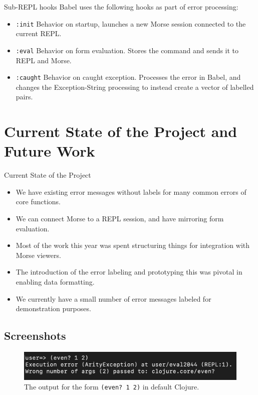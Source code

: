\documentclass{beamer}
\begin{document}
\begin{frame}{Sub-REPL hooks}
  Babel uses the following hooks as part of error processing:
  \begin{itemize}
    \item<1-> \texttt{:init} Behavior on startup, launches a new Morse session connected to the current REPL.
    \item<2-> \texttt{:eval} Behavior on form evaluation. Stores the command and sends it to REPL and Morse.
    \item<3-> \texttt{:caught} Behavior on caught exception. Processes the error in Babel, and changes the Exception-\>String processing to instead create a vector of labelled pairs.  
  \end{itemize}
\end{frame}

\section{Current State of the Project and Future Work}
\begin{frame}{Current State of the Project}
  \begin{itemize}
    \item<1-> We have existing error messages without labels for many common errors of core functions.
    \item<2-> We can connect Morse to a REPL session, and have mirroring form evaluation.
    \item<3-> Most of the work this year was spent structuring things for integration with Morse viewers.
    \item<4-> The introduction of the error labeling and prototyping this was pivotal in enabling data formatting.
    \item<5-> We currently have a small number of error messages labeled for demonstration purposes.
  \end{itemize}
\end{frame}

\subsection{Screenshots}
\begin{frame}
  \begin{figure}
    \centering
    \includegraphics[width=\textwidth]{../resources/CljDefaultEven.png}
    \caption{The output for the form \texttt{(even? 1 2)} in default Clojure.}
    \label{fig:defaultclj}
  \end{figure}
\end{frame}
\end{document}
